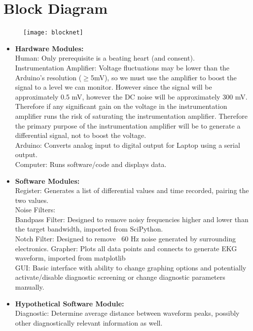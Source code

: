 \documentclass[11pt, oneside]{article}   	%
\begin{document}
\section{Block Diagram}
\begin{figure}[htb!]
\centering
\texttt{[image: blocknet]}
\end{figure}
\begin{itemize}[leftmargin=*]

\item[] \textbf{Hardware Modules:}\\
	Human: Only prerequisite is a beating heart (and consent).\\
	Instrumentation Amplifier: Voltage fluctuations may be lower than the Arduino's resolution ($\geq$5mV), so we must use the amplifier to boost the signal to a level we can monitor. However since the signal will be approximately 0.5 mV, however the DC noise will be approximately 300 mV. \cite{karptalk} Therefore if any significant gain on the voltage in the instrumentation amplifier runs the risk of saturating the instrumentation amplifier. Therefore the primary purpose of the instrumentation amplifier will be to generate a differential signal, not to boost the voltage.\\
	Arduino: Converts analog input to digital output for Laptop using a serial output.\\
	Computer: Runs software/code and displays data. 
	
\item[] \textbf{Software Modules:}\\
	Register: Generates a list of differential values and time recorded, pairing the two values.\\
	Noise Filters:\\
		Bandpass Filter: Designed to remove noisy frequencies higher and lower than the target bandwidth, imported from SciPython. \cite{SciPython}\\
		Notch Filter: Designed to remove ~60 Hz noise generated by surrounding electronics.  
	Grapher: Plots all data points and connects to generate EKG waveform, imported from matplotlib\\
	GUI: Basic interface with ability to change graphing options and potentially activate/disable diagnostic screening or change diagnostic parameters manually.\\
	
\item[] \textbf{Hypothetical Software Module:}\\
	Diagnostic: Determine average distance between waveform peaks, possibly other diagnostically relevant information as well.
\end{itemize}
\end{document}
